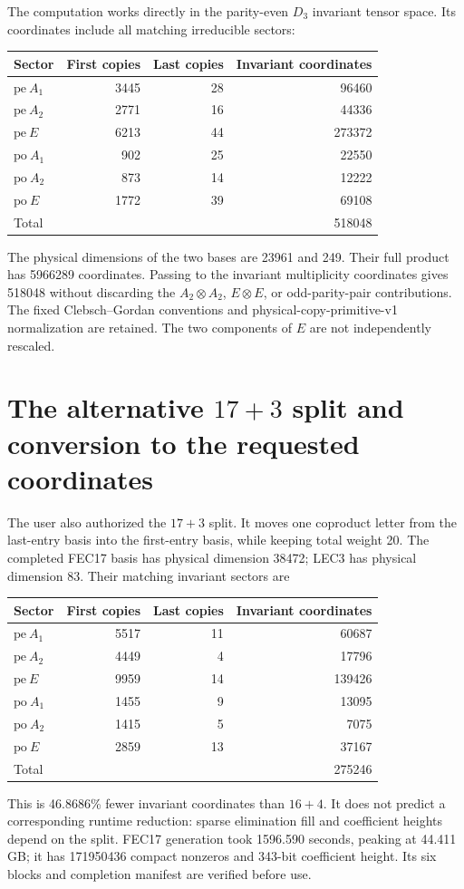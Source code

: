 \documentclass[11pt]{article}
\begin{document}
The computation works directly in the parity-even $D_3$ invariant tensor
space. Its coordinates include all matching irreducible sectors:
\begin{center}
\begin{tabular}{lrrr}\toprule
Sector & First copies & Last copies & Invariant coordinates\\\midrule
$\mathrm{pe}\ A_1$ & 3445 & 28 & 96460\\
$\mathrm{pe}\ A_2$ & 2771 & 16 & 44336\\
$\mathrm{pe}\ E$   & 6213 & 44 & 273372\\
$\mathrm{po}\ A_1$ & 902 & 25 & 22550\\
$\mathrm{po}\ A_2$ & 873 & 14 & 12222\\
$\mathrm{po}\ E$   & 1772 & 39 & 69108\\\midrule
Total & & & 518048\\\bottomrule
\end{tabular}
\end{center}
The physical dimensions of the two bases are 23961 and 249. Their full
product has 5966289 coordinates. Passing to the invariant multiplicity
coordinates gives 518048 without discarding the $A_2\otimes A_2$,
$E\otimes E$, or odd-parity-pair contributions. The fixed Clebsch--Gordan
conventions and physical-copy-primitive-v1 normalization are retained.
The two components of $E$ are not independently rescaled.

\section{The alternative $17+3$ split and conversion to the requested coordinates}
The user also authorized the $17+3$ split. It moves one coproduct letter
from the last-entry basis into the first-entry basis, while keeping total
weight 20. The completed FEC17 basis has physical dimension 38472; LEC3 has
physical dimension 83. Their matching invariant sectors are
\begin{center}
\begin{tabular}{lrrr}\toprule
Sector & First copies & Last copies & Invariant coordinates\\\midrule
$\mathrm{pe}\ A_1$ & 5517 & 11 & 60687\\
$\mathrm{pe}\ A_2$ & 4449 & 4 & 17796\\
$\mathrm{pe}\ E$ & 9959 & 14 & 139426\\
$\mathrm{po}\ A_1$ & 1455 & 9 & 13095\\
$\mathrm{po}\ A_2$ & 1415 & 5 & 7075\\
$\mathrm{po}\ E$ & 2859 & 13 & 37167\\\midrule
Total & & & 275246\\\bottomrule
\end{tabular}
\end{center}
This is 46.8686\% fewer invariant coordinates than $16+4$. It does not
predict a corresponding runtime reduction: sparse elimination fill and
coefficient heights depend on the split. FEC17 generation took 1596.590
seconds, peaking at 44.411 GB; it has 171950436 compact nonzeros and
343-bit coefficient height. Its six blocks and completion manifest are
verified before use.
\end{document}
